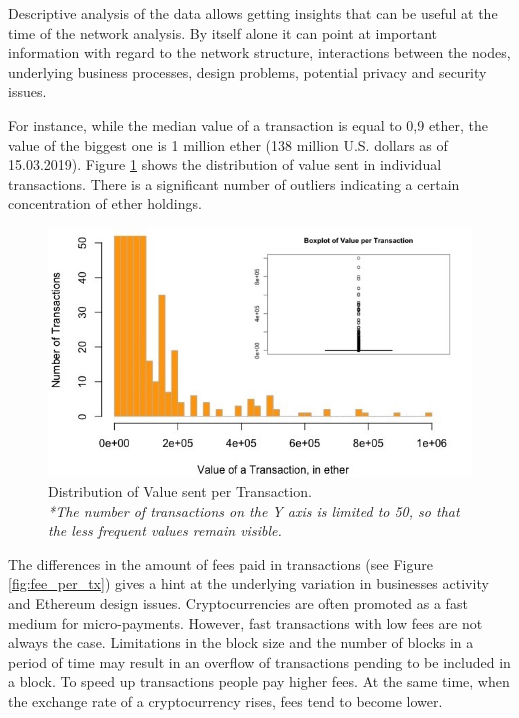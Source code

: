 Descriptive analysis of the data allows getting insights that can be useful at the time of the network analysis.
By itself alone it can point at important information with regard to the network structure, interactions between the nodes, underlying business processes, design problems, potential privacy and security issues.

For instance, while the median value of a transaction is equal to 0,9 ether, the value of the biggest one is 1 million ether (138 million U.S. dollars as of 15.03.2019). 
Figure \ref{fig:value_per_tx} shows the distribution of value sent in individual transactions. 
There is a significant number of outliers indicating a certain concentration of ether holdings.


\begin{figure}[h]
  \centering
  \includegraphics[width=\linewidth]{figures/value_per_tx.jpeg}
  \caption{Distribution of Value sent per Transaction.\\ 
  \textit{*The number of transactions on the Y axis is limited to 50, so that the less frequent values remain visible.}}
  \label{fig:value_per_tx}
\end{figure}

The differences in the amount of fees paid in transactions (see Figure \ref{fig:fee_per_tx}) gives a hint at the underlying variation in businesses activity and Ethereum design issues.
Cryptocurrencies are often promoted as a fast medium for micro-payments. 
However, fast transactions with low fees are not always the case.
Limitations in the block size and the number of blocks in a period of time may result in an overflow of transactions pending to be included in a block.
To speed up transactions people pay higher fees.
At the same time, when the exchange rate of a cryptocurrency rises, fees tend to become lower.

